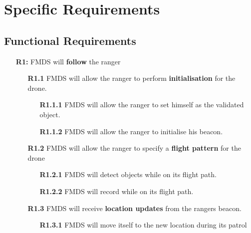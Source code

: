 \chapter{Specific Requirements}

\section{Functional Requirements}

\begin{itemize}
    \item  [\textbf{R1:}] FMDS will \textbf{follow} the ranger
    
    \begin{itemize}
            \item  [\textbf{R1.1}] FMDS will allow the ranger to perform \textbf{initialisation} for the drone.
                \begin{itemize}
                    \item [\textbf{R1.1.1}] FMDS will allow the ranger to set himself as the validated object.
                    \item [\textbf{R1.1.2}] FMDS will allow the ranger to initialise his beacon. 
                \end{itemize}

            \item  [\textbf{R1.2}] FMDS will allow the ranger to specify a \textbf{flight pattern} for the drone
                \begin{itemize}
                    \item [\textbf{R1.2.1}] FMDS will detect objects while on its flight path.
                    \item [\textbf{R1.2.2}] FMDS will record while on its flight path.
                \end{itemize}

            \item  [\textbf{R1.3}] FMDS will receive \textbf{location updates} from the rangers beacon.
                \begin{itemize}
                    \item  [\textbf{R1.3.1}] FMDS will move itself to the new location during its patrol
                \end{itemize}
    \end{itemize}
\end{itemize}

